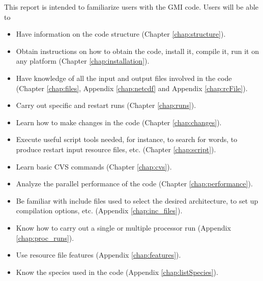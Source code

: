 This report is intended to familiarize users with the GMI code.
Users will be able to 
\begin{itemize}
\item Have information on the code structure (Chapter \ref{chap:structure}).
\item Obtain instructions on how to obtain the code, install it, 
      compile it, run it on any platform (Chapter \ref{chap:installation}).
\item Have knowledge of all the input and output files involved in the
      code (Chapter \ref{chap:files}, Appendix \ref{chap:netcdf} and
      Appendix \ref{chap:rcFile}).
\item Carry out specific and restart runs (Chapter \ref{chap:runs}).
\item Learn how to make changes in the code (Chapter \ref{chap:changes}).
\item Execute useful script tools needed, for instance, to search
      for words, to produce restart input resource files, etc.
      (Chapter \ref{chap:script}).
\item Learn basic CVS commands (Chapter \ref{chap:cvs}).
\item Analyze the parallel performance of the code 
      (Chapter \ref{chap:performance}).
\item Be familiar with include files used to select the desired architecture,
      to set up compilation options, etc. (Appendix \ref{chap:inc_files}).
\item Know how to carry out a single or multiple processor run 
      (Appendix \ref{chap:proc_runs}).
\item Use resource file features (Appendix \ref{chap:features}).
\item Know the species used in the code (Appendix \ref{chap:listSpecies}).
\end{itemize}
